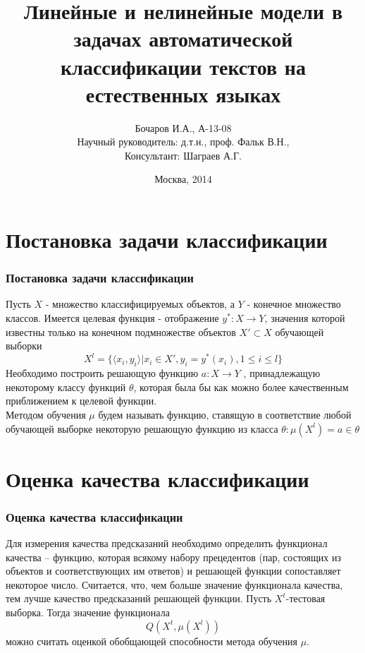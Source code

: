 \documentclass{beamer}
\begin{document}
\title[Линейные и нелинейные модели]{Линейные и нелинейные модели в задачах автоматической классификации текстов на естественных языках}  
\author[Бочаров И.А.]{Бочаров И.А., А-13-08 \\Научный руководитель: д.т.н., проф. Фальк В.Н.,\\Консультант: Шаграев А.Г.}

\date{Москва, 2014} 
\begin{frame}[plain]
	\titlepage
\end{frame}
\begin{frame}
	\tableofcontents
\end{frame}


\section{Постановка задачи классификации}
\begin{frame}
\frametitle{Постановка задачи классификации}
Пусть $X$ - множество классифицируемых объектов, а $Y$ - конечное множество классов. Имеется целевая функция - отображение $y^*:X\rightarrow Y$, значения которой известны только на конечном подмножестве объектов $X' \subset X$ обучающей выборки \\
$$X^l=\{\langle x_i,y_i \rangle |x_i \in X', y_i=y^*(x_i),1\le i \le l\}$$
Необходимо построить решающую функцию $a: X \rightarrow Y$ , принадлежащую
некоторому классу функций $\theta$, которая была бы как можно более качественным
приближением к целевой функции. 
\\Методом обучения $\mu$ будем называть функцию, ставящую в соответствие любой обучающей выборке некоторую
решающую функцию из класса $\theta: \mu(X^l)=a \in \theta$
\end{frame}

\section{Оценка качества классификации}
\begin{frame}
\frametitle{Оценка качества классификации}
Для измерения качества предсказаний необходимо определить функционал
качества – функцию, которая всякому набору прецедентов (пар, состоящих из
объектов и соответствующих им ответов) и решающей функции сопоставляет
некоторое число. Считается, что, чем больше значение функционала качества, тем лучше качество предсказаний решающей функции.
\newline
\newline
\newline
Пусть $X^t$-тестовая выборка. Тогда значение функционала $$Q(X^t,\mu(X^l))$$ можно считать оценкой обобщающей способности метода обучения $\mu$.
\end{frame}
\end{document}
